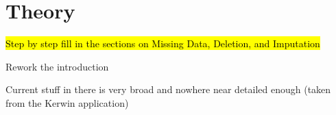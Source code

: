 \section*{Theory}
	\begin{coi}
		\item \hl{Step by step fill in the sections on Missing Data, Deletion, and Imputation}
		\item Rework the introduction
			\begin{coi}
				\item Current stuff in there is very broad and nowhere near detailed enough (taken from the Kerwin application)
			\end{coi}
	\end{coi}


			

